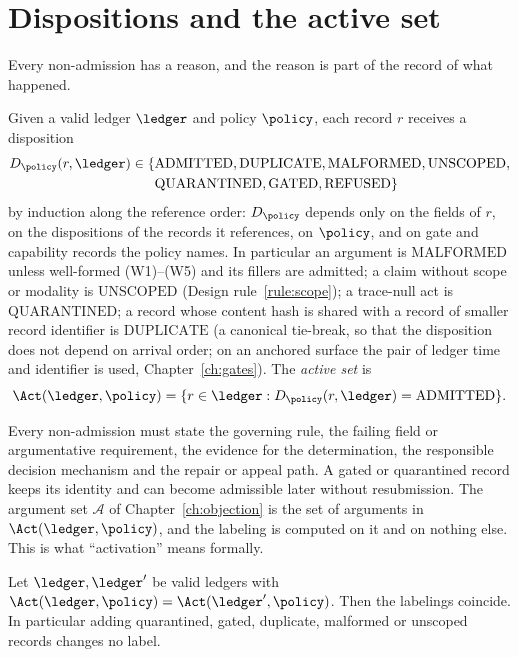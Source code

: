 \section{Dispositions and the active set}

Every non-admission has a reason, and the reason is part of the record of what happened.

\begin{definition}[Disposition]\label{def:disposition}
Given a valid ledger $\ledger$ and policy $\policy$, each record $r$ receives a disposition
\begin{align*}
D_\policy(r,\ledger)\in\{{}&\mathrm{ADMITTED},\mathrm{DUPLICATE},\mathrm{MALFORMED},\mathrm{UNSCOPED},\\&\mathrm{QUARANTINED},\mathrm{GATED},\mathrm{REFUSED}\}
\end{align*}
by induction along the reference order: $D_\policy$ depends only on the fields of $r$, on the dispositions of the records it references, on $\policy$, and on gate and capability records the policy names. In particular an argument is $\mathrm{MALFORMED}$ unless well-formed (W1)--(W5) and its fillers are admitted; a claim without scope or modality is $\mathrm{UNSCOPED}$ (Design rule~\ref{rule:scope}); a trace-null act is $\mathrm{QUARANTINED}$; a record whose content hash is shared with a record of smaller record identifier is $\mathrm{DUPLICATE}$ (a canonical tie-break, so that the disposition does not depend on arrival order; on an anchored surface the pair of ledger time and identifier is used, Chapter~\ref{ch:gates}). The \emph{active set} is
\[
\Act(\ledger,\policy)=\{r\in\ledger: D_\policy(r,\ledger)=\mathrm{ADMITTED}\}.
\]
\end{definition}

Every non-admission must state the governing rule, the failing field or argumentative requirement, the evidence for the determination, the responsible decision mechanism and the repair or appeal path. A gated or quarantined record keeps its identity and can become admissible later without resubmission. The argument set $\mathcal A$ of Chapter~\ref{ch:objection} is the set of arguments in $\Act(\ledger,\policy)$, and the labeling is computed on it and on nothing else. This is what ``activation'' means formally.

\begin{proposition}\label{prop:inert}
Let $\ledger,\ledger'$ be valid ledgers with $\Act(\ledger,\policy)=\Act(\ledger',\policy)$. Then the labelings coincide. In particular adding quarantined, gated, duplicate, malformed or unscoped records changes no label.
\end{proposition}

